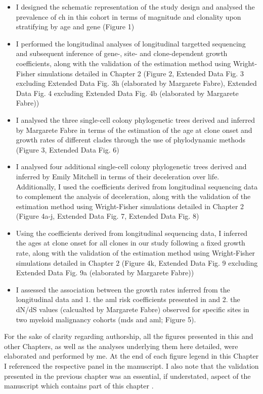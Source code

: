 \begin{itemize}
	\item I designed the schematic representation of the study design and analysed the prevalence of \ac{ch} in this cohort in terms of magnitude and clonality upon stratifying by age and gene (Figure 1)
	\item I performed the longitudinal analyses of longitudinal targetted sequencing and subsequent inference of gene-, site- and clone-dependent growth coefficients, along with the validation of the estimation method using Wright-Fisher simulations detailed in Chapter 2 (Figure 2, Extended Data Fig. 3 excluding Extended Data Fig. 3h (elaborated by Margarete Fabre), Extended Data Fig. 4 excluding Extended Data Fig. 4b (elaborated by Margarete Fabre))
	\item I analysed the three single-cell colony phylogenetic trees derived and inferred by Margarete Fabre in terms of the estimation of the age at clone onset and growth rates of different clades through the use of phylodynamic methods (Figure 3, Extended Data Fig. 6)
	\item I analysed four additional single-cell colony phylogenetic trees derived and inferred by Emily Mitchell in terms of their deceleration over life. Additionally, I used the coefficients derived from longitudinal sequencing data to complement the analysis of deceleration, along with the validation of the estimation method using Wright-Fisher simulations detailed in Chapter 2 (Figure 4a-j, Extended Data Fig. 7, Extended Data Fig. 8)
	\item Using the coefficients derived from longitudinal sequencing data, I inferred the ages at clone onset for all clones in our study following a fixed growth rate, along with the validation of the estimation method using Wright-Fisher simulations detailed in Chapter 2 (Figure 4k, Extended Data Fig. 9 excluding Extended Data Fig. 9a (elaborated by Margarete Fabre))
	\item I assessed the association between the growth rates inferred from the longitudinal data and 1. the \ac{aml} risk coefficients presented in  \cite{Abelson2018-wh} and 2. the dN/dS values (calcualted by Margarete Fabre) observed for specific sites in two myeloid malignancy cohorts (\ac{mds} and \ac{aml}; Figure 5).
\end{itemize}

For the sake of clarity regarding authorship, all the figures presented in this and other Chapters, as well as the analyses underlying them here detailed, were elaborated and performed by me. At the end of each figure legend in this Chapter I referenced the respective panel in the manuscript. I also note that the validation presented in the previous chapter was an essential, if understated, aspect of the manuscript which contains part of this chapter \cite{Fabre2021-uw}.

